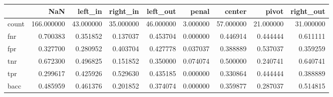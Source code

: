 \begin{tabular}{lrrrrrrrr}
\toprule
{} &         NaN &    left\_in &   right\_in &   left\_out &     penal &     center &      pivot &  right\_out \\
\midrule
count &  166.000000 &  43.000000 &  35.000000 &  46.000000 &  3.000000 &  57.000000 &  21.000000 &  31.000000 \\
fnr   &    0.700383 &   0.351852 &   0.137037 &   0.453704 &  0.000000 &   0.446914 &   0.444444 &   0.611111 \\
fpr   &    0.327700 &   0.280952 &   0.403704 &   0.427778 &  0.037037 &   0.388889 &   0.537037 &   0.359259 \\
tnr   &    0.672300 &   0.496825 &   0.151852 &   0.350000 &  0.074074 &   0.500000 &   0.240741 &   0.640741 \\
tpr   &    0.299617 &   0.425926 &   0.529630 &   0.435185 &  0.000000 &   0.330864 &   0.444444 &   0.388889 \\
bacc  &    0.485959 &   0.461376 &   0.201852 &   0.374074 &  0.000000 &   0.359877 &   0.287037 &   0.514815 \\
\bottomrule
\end{tabular}
